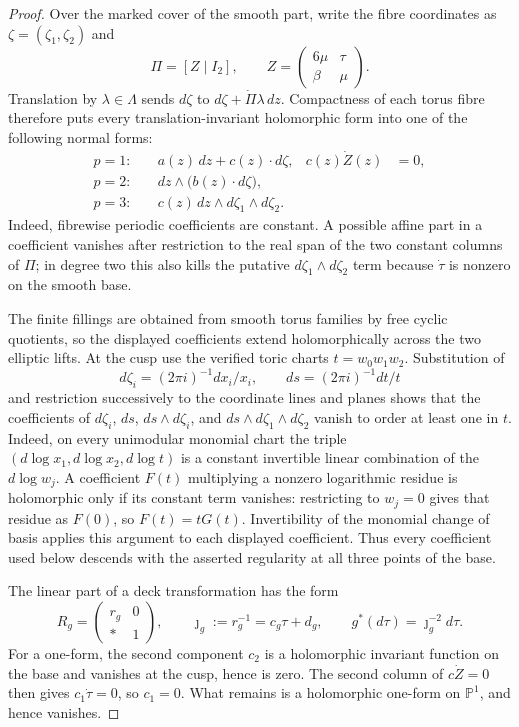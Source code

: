 \begin{proof}
Over the marked cover of the smooth part, write the fibre coordinates as
$\zeta=(\zeta_1,\zeta_2)$ and
\[
 \Pi=[Z\mid I_2],\qquad
 Z=\begin{pmatrix}6\mu&\tau\\ \beta&\mu\end{pmatrix}.
\]
Translation by $\lambda\in\Lambda$ sends
$d\zeta$ to $d\zeta+\dot\Pi\lambda\,dz$.  Compactness of each torus fibre
therefore puts every translation-invariant holomorphic form into one of the
following normal forms:
\begin{align*}
 p=1:&\quad a(z)\,dz+c(z)\cdot d\zeta,
       &c(z)\dot Z(z)&=0,\\
 p=2:&\quad dz\wedge\bigl(b(z)\cdot d\zeta\bigr),\\
 p=3:&\quad c(z)\,dz\wedge d\zeta_1\wedge d\zeta_2.
\end{align*}
Indeed, fibrewise periodic coefficients are constant.  A possible affine
part in a coefficient vanishes after restriction to the real span of the
two constant columns of $\Pi$; in degree two this also kills the putative
$d\zeta_1\wedge d\zeta_2$ term because $\dot\tau$ is nonzero on the smooth
base.

The finite fillings are obtained from smooth torus families by free cyclic
quotients, so the displayed coefficients extend holomorphically across the
two elliptic lifts.  At the cusp use the verified toric charts
$t=w_0w_1w_2$.  Substitution of
\[
 d\zeta_i=(2\pi i)^{-1}dx_i/x_i,
 \qquad ds=(2\pi i)^{-1}dt/t
\]
and restriction successively to the coordinate lines and planes shows that
the coefficients of $d\zeta_i$, $ds$, $ds\wedge d\zeta_i$, and
$ds\wedge d\zeta_1\wedge d\zeta_2$ vanish to order at least one in $t$.
Indeed, on every unimodular monomial chart the triple
$(d\log x_1,d\log x_2,d\log t)$ is a constant invertible linear combination
of the $d\log w_j$.  A coefficient $F(t)$ multiplying a nonzero logarithmic
residue is holomorphic only if its constant term vanishes: restricting to
$w_j=0$ gives that residue as $F(0)$, so $F(t)=tG(t)$.  Invertibility of the
monomial change of basis applies this argument to each displayed
coefficient.
Thus every coefficient used below descends with the asserted regularity at
all three points of the base.

The linear part of a deck transformation has the form
\[
 R_g=\begin{pmatrix}r_g&0\\ *&1\end{pmatrix},
 \qquad \jmath_g:=r_g^{-1}=c_g\tau+d_g,
 \qquad g^*(d\tau)=\jmath_g^{-2}d\tau.
\]
For a one-form, the second component $c_2$ is a holomorphic invariant
function on the base and vanishes at the cusp, hence is zero.  The second
column of $c\dot Z=0$ then gives $c_1\dot\tau=0$, so $c_1=0$.  What remains
is a holomorphic one-form on $\mathbb P^1$, and hence vanishes.


\end{proof}

